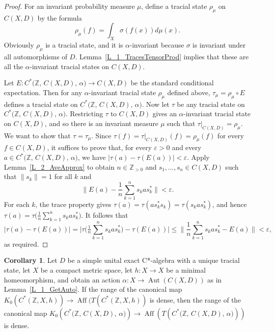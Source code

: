 \documentclass[10pt]{amsart}
\numberwithin{equation}{section}
\theoremstyle{definition}
\newtheorem{cor}[thm]{Corollary}
\newcommand{\af}{\alpha}
\newcommand{\ep}{\varepsilon}
\newcommand{\sm}{\sigma}
\newcommand{\Z}{{\mathbb{Z}}}
\newcommand{\N}{{\mathbb{Z}}_{> 0}}
\newcommand{\Aut}{{\operatorname{Aut}}}
\newcommand{\Aff}{{\operatorname{Aff}}}
\newcommand{\ds}[1]{{\displaystyle{#1}}}
\begin{document}
\begin{proof}
For an invariant probability measure $\mu$, define
a tracial state $\rho_{\mu}$ on $C (X, D)$ by the formula
%
\[
\rho_{\mu} (f) = \int_X \sm (f (x)) d \mu (x).
\]
%
Obviously $\rho_{\mu}$ is a tracial state,
and it is $\af$-invariant because $\sm$ is invariant
under all automorphisms of $D$.
Lemma~\ref{L_1_TracesTensorProd} implies that these
are all the $\af$-invariant tracial states on $C (X, D)$.

Let
$E \colon C^* \bigl( \Z, \, C (X, D), \, \af \bigr) \to C (X, D)$
be the standard conditional expectation.
Then for any
$\af$-invariant tracial state $\rho_{\mu}$ defined above,
$\tau_{\mu} = \rho_{\mu} \circ E$ defines a tracial state
on $C^* \bigl( \Z, \, C (X, D), \, \af \bigr)$.
Now let
$\tau$ be any tracial state on
$C^* \bigl( \Z, \, C (X, D), \, \af \bigr)$.
Restricting
$\tau$ to $C (X, D)$ gives an $\af$-invariant tracial
state on $C (X, D)$, and so there is an invariant
measure $\mu$ such that $\tau \vert_{C (X,D)} = \rho_{\mu}$.
We want to show that $\tau = \tau_{\mu}$.
Since $\tau (f)
= \tau \vert_{C (X,D)} (f) = \rho_{\mu} (f)$
for every $f \in C (X,D)$, it suffices
to prove that, for every $\ep> 0$ and every $a \in
C^* \bigl( \Z, \, C (X, D), \, \af \bigr)$, we have
$\vert \tau (a) - \tau (E(a)) \vert < \ep$.
Apply
Lemma~\ref{L_2_AveApprox} to obtain $n \in \N$ and
$s_1 , \ldots , s_n \in C (X,D)$ such that
$\lVert s_k \rVert = 1$ for all $k$ and
%
\[
\Big\lVert E(a) - \frac{1}{n} \sum_{k=1}^{n} s_k a s_k^*
\Big\rVert < \ep.
\]
%
For each $k$, the trace property gives $\tau (a) =
\tau (a s_k^* s_k ) = \tau (s_k a s_k^* )$, and hence
$\ds{ \tau (a) = \tau \Big( \tfrac{1}{n}
\sum_{k=1}^{n} s_k a s_k^* \Big) }$. It follows that
%
\[
\vert \tau (a) - \tau (E(a)) \vert = \Big\vert \tau
\Big( \tfrac{1}{n} \sum_{k=1}^{n} s_k a s_k^* \Big) -
\tau (E(a)) \Big\vert \leq \Big\lVert
\frac{1}{n} \sum_{k=1}^{n} s_k a s_k^* - E(a) \Big\rVert
< \ep,
\]
%
as required.
%
\end{proof}

\begin{cor}\label{C_1_RR0_Condition}
Let $D$ be a simple unital exact C*-algebra with
a unique tracial state, let $X$ be a compact
metric space, let $h \colon X \to X$ be a minimal
homeomorphism, and obtain an action
$\af \colon X \to \Aut ( C (X, D))$ as in
Lemma~\ref{L_1_GetAuto}.
If the range of the
canonical map
$K_{0} ( C^* ( \Z, X, h ) ) \to
\Aff (T( C^* ( \Z, X, h ) )$
is dense, then the range of the canonical map
$K_{0} ( C^* \bigl( \Z, \, C (X, D), \, \af \bigr) ) \to
\Aff (T( C^* \bigl( \Z, \, C (X, D), \, \af \bigr) ))$
is dense.
\end{cor}
\end{document}
